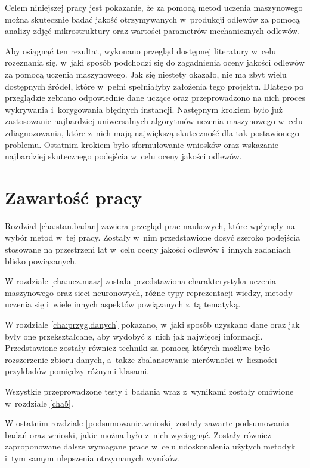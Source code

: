 Celem niniejszej pracy jest pokazanie, że za pomocą metod uczenia maszynowego można skutecznie badać jakość otrzymywanych w~produkcji odlewów za pomocą analizy zdjęć mikrostruktury oraz wartości parametrów mechanicznych odlewów. 

Aby osiągnąć ten rezultat, wykonano przegląd dostępnej literatury w~celu rozeznania się, w~jaki sposób podchodzi się do zagadnienia oceny jakości odlewów za pomocą uczenia maszynowego. Jak się niestety okazało, nie ma zbyt wielu dostępnych źródeł, które w~pełni spełniałyby założenia tego projektu. Dlatego po przeglądzie zebrano odpowiednie dane uczące oraz przeprowadzono na nich proces wykrywania i~korygowania błędnych instancji. Następnym krokiem było już zastosowanie najbardziej uniwersalnych algorytmów uczenia maszynowego w~celu zdiagnozowania, które z~nich mają największą skuteczność dla tak postawionego problemu. Ostatnim krokiem było sformułowanie wniosków oraz wskazanie najbardziej skutecznego podejścia w~celu oceny jakości odlewów.



\section{Zawartość pracy}
\label{sec:zawartosc}

Rozdział \ref{cha:stan.badan} zawiera przegląd prac naukowych, które wpłynęły na wybór metod w~tej pracy. Zostały w~nim przedstawione dosyć szeroko podejścia stosowane na przestrzeni lat w~celu oceny jakości odlewów i~innych zadaniach blisko powiązanych. 

W rozdziale \ref{cha:ucz.masz} została przedstawiona charakterystyka uczenia maszynowego oraz sieci neuronowych, różne typy reprezentacji wiedzy, metody uczenia się i~wiele innych aspektów powiązanych z~tą tematyką. 

W rozdziale \ref{cha:przyg.danych} pokazano, w~jaki sposób uzyskano dane oraz jak były one przekształcane, aby wydobyć z~nich jak najwięcej informacji. Przedstawione zostały również techniki za pomocą których możliwe było rozszerzenie zbioru danych, a~także zbalansowanie nierówności w~liczności przykładów pomiędzy różnymi klasami.

Wszystkie przeprowadzone testy i~badania wraz z~wynikami zostały omówione w~rozdziale \ref{cha5}. 

W ostatnim rozdziale \ref{podsumowanie.wnioski} zostały zawarte podsumowania badań oraz wnioski, jakie można było z~nich wyciągnąć. Zostały również zaproponowane dalsze wymagane prace w~celu udoskonalenia użytych metodyk i~tym samym ulepszenia otrzymanych wyników.













